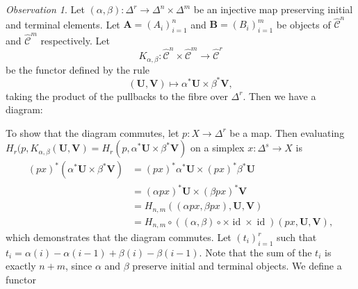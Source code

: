 \documentclass[leqno]{article}
\numberwithin{equation}{subsection}
\theoremstyle{plain}   %
\theoremstyle{remark}
\newtheorem{obs}[equation]{Observation}
\theoremstyle{plain}
\DeclareMathOperator{\id}{id}
\newcommand{\overcat}[2]{{\left(#1\downarrow #2\right)}}
\newcommand{\psh}[1]{\ensuremath{\widehat{#1}}}
\providecommand{\C}{}
\renewcommand{\C}{\ensuremath{\mathcal{C}}}
\newcommand{\ssetlab}{\ensuremath{\widehat{\Delta} \int \widehat{\mathcal{C}}}}
\begin{document}
\begin{obs}\label{square2}
	Let \((\alpha, \beta): \Delta^r \to \Delta^n\times \Delta^m\) be an injective map preserving initial and terminal elements.  Let \(\mathbf{A}=(A_i)^n_{i=1}\) and \(\mathbf{B}=(B_i)^m_{i=1}\) be objects of \(\psh{\C}^n\) and \(\psh{\C}^m\) respectively.  Let 
	\[K_{\alpha,\beta}:\psh{\C}^n \times \psh{\C}^m\to \psh{\C}^r\] be the functor defined by the rule
	\[(\mathbf{U},\mathbf{V})\mapsto \alpha^\ast \mathbf{U} \times \beta^\ast \mathbf{V},\]
	taking the product of the pullbacks to the fibre over \(\Delta^r\).  Then we have a diagram:
	\begin{center}
	\end{center}
	To show that the diagram commutes, let \(p:X\to \Delta^r\) be a map.  Then evaluating \(H_r(p,K_{\alpha,\beta}(\mathbf{U},\mathbf{V})=H_r(p,\alpha^*\mathbf{U} \times \beta^*\mathbf{V})\) on a simplex \(x:\Delta^s\to X\) is 
	\begin{align*}
		(px)^\ast(\alpha^\ast\mathbf{U} \times \beta^\ast\mathbf{V}) &= (px)^\ast\alpha^\ast\mathbf{U} \times (px)^\ast\beta^\ast\mathbf{U}\\
		&=(\alpha px)^\ast\mathbf{U} \times (\beta px)^\ast\mathbf{V}\\
		&=H_{n,m}((\alpha px, \beta px),\mathbf{U},\mathbf{V})\\
		&=H_{n,m}\circ ((\alpha,\beta)\circ \times \id \times \id) (px,\mathbf{U},\mathbf{V}), 
	\end{align*}
	which demonstrates that the diagram commutes.
	Let \((t_i)_{i=1}^r\) such that \(t_i=\alpha(i)-\alpha(i-1) +\beta(i) - \beta(i-1)\).  Note that the sum of the \(t_i\) is exactly \(n+m\), since \(\alpha\) and \(\beta\) preserve initial and terminal objects.  We define a functor 

\end{obs}
\end{document}

